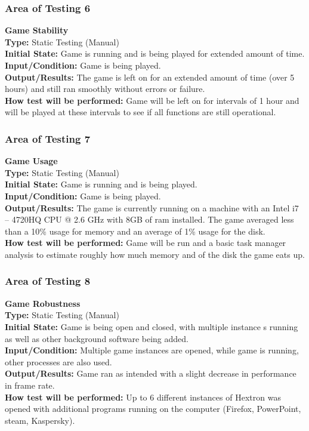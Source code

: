 \documentclass[12pt, titlepage]{article}
\begin{document}
{\color{blue}
\subsubsection{Area of Testing 6}
\noindent \textbf{Game Stability}\\
\textbf{Type:} Static Testing (Manual)\\
\textbf{Initial State:} Game is running and is being played for extended amount of time. \\
\textbf{Input/Condition:} Game is being played. \\
\textbf{Output/Results:} The game is left on for an extended amount of time (over 5 hours) and still ran smoothly without errors or failure.\\
\textbf{How test will be performed:} Game will be left on for intervals of 1 hour and will be played at these intervals to see if all functions are still operational.

\subsubsection{Area of Testing 7}
\noindent \textbf{Game Usage}\\
\textbf{Type:} Static Testing (Manual)\\
\textbf{Initial State:} Game is running and is being played. \\
\textbf{Input/Condition:} Game is being played. \\
\textbf{Output/Results:} The game is currently running on a machine with an Intel i7 – 4720HQ CPU @ 2.6 GHz with 8GB of ram installed. The game averaged less than a 10\% usage for memory and an average of 1\% usage for the disk.  \\
\textbf{How test will be performed:} Game will be run and a basic task manager analysis to estimate roughly how much memory and of the disk the game eats up. 


\subsubsection{Area of Testing 8}
\noindent \textbf{Game Robustness }\\
\textbf{Type:} Static Testing (Manual)\\
\textbf{Initial State:} Game is being open and closed, with multiple instance s running as well as other background software being added. \\
\textbf{Input/Condition:} Multiple game instances are opened, while game is running, other processes are also used. \\
\textbf{Output/Results:} Game ran as intended with a slight decrease in performance in frame rate.\\
\textbf{How test will be performed:} Up to 6 different instances of Hextron was opened with additional programs running on the computer (Firefox, PowerPoint, steam, Kaspersky).

}
\end{document}
